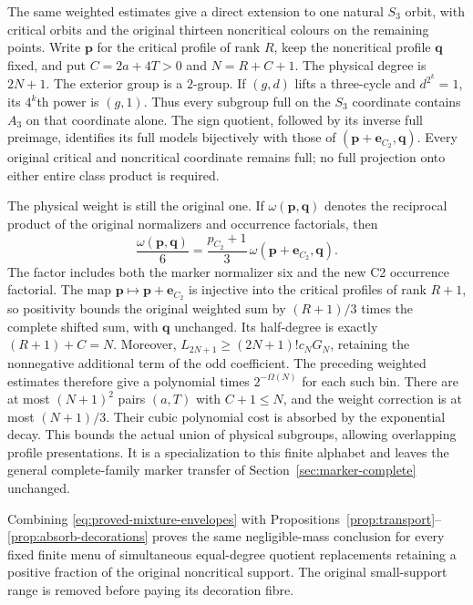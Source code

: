 The same weighted estimates give a direct extension to one natural
$S_3$ orbit, with critical orbits and the original thirteen noncritical
colours on the remaining points. Write $\mathbf p$ for the critical
profile of rank $R$, keep the noncritical profile $\mathbf q$ fixed,
and put $C=2a+4T>0$ and $N=R+C+1$. The physical degree is $2N+1$.
The exterior group is a $2$-group. If $(g,d)$ lifts a three-cycle and
$d^{2^k}=1$, its $4^k$th power is $(g,1)$. Thus every subgroup full
on the $S_3$ coordinate contains $A_3$ on that coordinate alone.
The sign quotient, followed by its inverse full preimage, identifies
its full models bijectively with those of
$(\mathbf p+\mathbf e_{C_2},\mathbf q)$. Every original critical and
noncritical coordinate remains full; no full projection onto either
entire class product is required.

The physical weight is still the original one. If
$\omega(\mathbf p,\mathbf q)$ denotes the reciprocal product of the
original normalizers and occurrence factorials, then
\[
 \frac{\omega(\mathbf p,\mathbf q)}6
 =\frac{p_{C_2}+1}{3}\,
       \omega(\mathbf p+\mathbf e_{C_2},\mathbf q).
\]
The factor includes both the marker normalizer six and the new C2
occurrence factorial. The map $\mathbf p\mapsto\mathbf p+\mathbf e_{C_2}$
is injective into the critical profiles of rank $R+1$, so positivity
bounds the original weighted sum by $(R+1)/3$ times the complete
shifted sum, with $\mathbf q$ unchanged. Its half-degree is exactly
$(R+1)+C=N$. Moreover,
$L_{2N+1}\geq(2N+1)!c_NG_N$, retaining the nonnegative additional
term of the odd coefficient. The preceding weighted estimates therefore
give a polynomial times $2^{-\Omega(N)}$ for each such bin.
There are at most $(N+1)^2$ pairs $(a,T)$ with $C+1\leq N$, and the
weight correction is at most $(N+1)/3$. Their cubic polynomial cost
is absorbed by the exponential decay. This bounds the actual union
of physical subgroups, allowing overlapping profile presentations.
It is a specialization to this finite alphabet and leaves the general
complete-family marker transfer of Section~\ref{sec:marker-complete}
unchanged.

Combining \eqref{eq:proved-mixture-envelopes} with
Propositions~\ref{prop:transport}--\ref{prop:absorb-decorations}
proves the same negligible-mass conclusion for every fixed finite menu
of simultaneous equal-degree quotient replacements retaining a positive
fraction of the original noncritical support. The original small-support
range is removed before paying its decoration fibre.
